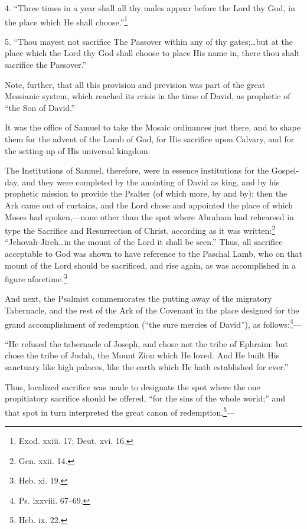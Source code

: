 4. “Three times in a year shall all thy males appear before the Lord thy God, in the place which He shall choose.”\footnote{\par  Exod. xxiii. 17; Deut. xvi. 16.}

5. “Thou mayest not sacrifice The Passover within any of thy gates;…but at the place which the Lord thy God shall choose to place His name in, there thou shalt sacrifice the Passover.”

Note, further, that all this provision and prevision was part of the great Messianic system, which reached its crisis in the time of David, as prophetic of “the Son of David.”

It was the office of Samuel to take the Mosaic ordinances just there, and to shape them for the advent of the Lamb of God, for His sacrifice upon Calvary, and for the setting-up of His universal kingdom.

The Institutions of Samuel, therefore, were in essence institutions for the Gospel-day, and they were completed by the anointing of David as king, and by his prophetic mission to provide the Psalter (of which more, by and by); then the Ark came out of curtains, and the Lord chose and appointed the place of which Moses had spoken,—none other than the spot where Abraham had rehearsed in type the Sacrifice and Resurrection of Christ, according as it was written:\footnote{\par  Gen. xxii. 14.} “Jehovah-Jireh…in the mount of the Lord it shall be seen.” Thus, all sacrifice acceptable to God was shown to have reference to the Paschal Lamb, who on that mount of the Lord should be sacrificed, and rise again, as was accomplished in a figure aforetime.\footnote{\par  Heb. xi. 19.}

And next, the Psalmist commemorates the putting away of the migratory Tabernacle, and the rest of the Ark of the Covenant in the place designed for the grand accomplishment of redemption (“the sure mercies of David”), as follows:\footnote{\par  Ps. lxxviii. 67–69.}—

“He refused the tabernacle of Joseph, and chose not the tribe of Ephraim: but chose the tribe of Judah, the Mount Zion which He loved. And He built His sanctuary like high palaces, like the earth which He hath established for ever.”

Thus, localized sacrifice was made to designate the spot where the one propitiatory sacrifice should be offered, “for the sins of the whole world;” and that spot in turn interpreted the great canon of redemption,\footnote{\par  Heb. ix. 22.}—

